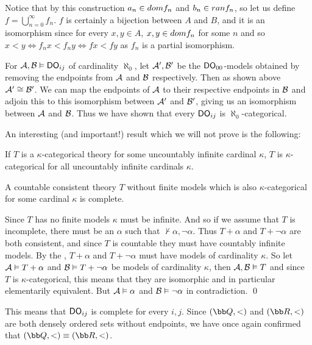    Notice that by this construction $a_n\in{\sl dom}f_n$ and $b_n\in{\sl ran}f_n$, so let us define $f=\bigcup_{n=0}^\infty f_n$.
    $f$ is certainly a bijection between $A$ and $B$, and it is an isomorphism since for every $x,y\in A$, $x,y\in{\sl dom}f_n$ for some $n$ and so $x<y\iff f_nx<f_ny\iff fx<fy$ as $f_n$ is a partial
    isomorphism.

    For ${\cal A},{\cal B}\vDash{\sf DO}_{ij}$ of cardinality $\aleph_0$, let ${\cal A}',{\cal B}'$ be the ${\sf DO}_{00}$-models obtained by removing the endpoints from ${\cal A}$ and ${\cal B}$
    respectively.
    Then as shown above ${\cal A}'\cong{\cal B}'$.
    We can map the endpoints of ${\cal A}$ to their respective endpoints in ${\cal B}$ and adjoin this to this isomorphism between ${\cal A}'$ and ${\cal B}'$, giving us an isomorphism between ${\cal A}$
    and ${\cal B}$.
    Thus we have shown that every ${\sf DO}_{ij}$ is $\aleph_0$-categorical.

\eexam

An interesting (and important!) result which we will not prove is the following:

\bthrm[title=Morley's Theorem, name=morleystheorem]

    If $T$ is a $\kappa$-categorical theory for some uncountably infinite cardinal $\kappa$, $T$ is $\kappa$-categorical for all uncountably infinite cardinals $\kappa$.

\ethrm

\bthrm[title=Vaught's Test, name=vaughtstest]

    A countable consistent theory $T$ without finite models which is also $\kappa$-categorical for some cardinal $\kappa$ is complete.

\ethrm

Since $T$ has no finite models $\kappa$ must be infinite.
And so if we assume that $T$ is incomplete, there must be an $\alpha$ such that $\nvdash\alpha,\neg\alpha$.
Thus $T+\alpha$ and $T+\neg\alpha$ are both consistent, and since $T$ is countable they must have countably infinite models.
By the , $T+\alpha$ and $T+\neg\alpha$ must have models of cardinality $\kappa$.
So let ${\cal A}\vDash T+\alpha$ and ${\cal B}\vDash T+\neg\alpha$ be models of cardinality $\kappa$, then ${\cal A},{\cal B}\vDash T$ and since $T$ is $\kappa$-categorical, this means that they are
isomorphic and in particular elementarily equivalent.
But ${\cal A}\vDash\alpha$ and ${\cal B}\vDash\neg\alpha$ in contradiction.
\qed

This means that ${\sf DO}_{ij}$ is complete for every $i,j$.
Since $({\bb Q},<)$ and $({\bb R},<)$ are both densely ordered sets without endpoints, we have once again confirmed that $({\bb Q},<)\equiv({\bb R},<)$.

